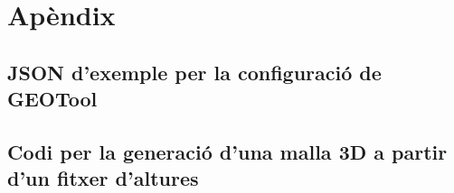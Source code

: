 \documentclass[10pt,a4paper]{article}
\begin{document}
\newpage
\appendix

\section*{Apèndix}

\setcounter{section}{1}

\subsection{JSON d'exemple per la configuració de GEOTool}
\label{appendix:geotoolconfig}


\subsection{Codi per la generació d'una malla 3D a partir d'un fitxer d'altures}
\label{appendix:generateobj}

\end{document}
